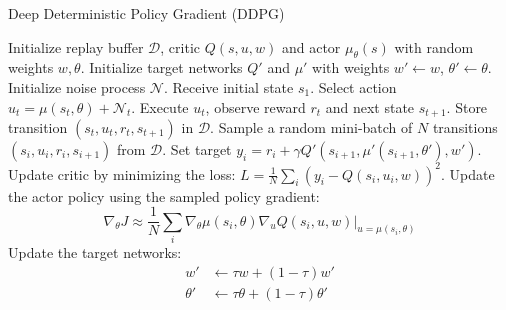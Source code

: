 \begin{frame}{Deep Deterministic Policy Gradient (DDPG)}
    \begin{algorithm}[H]
        \captionsetup{font=scriptsize}
        \caption{Deep Deterministic Policy Gradient}
        \begin{algorithmic}[1]
        \scriptsize
        \STATE Initialize replay buffer $\mathcal{D}$, critic $Q(s, u, w)$ and actor $\mu_\theta(s)$ with random weights $w, \theta$.
        \STATE Initialize target networks $Q'$ and $\mu'$ with weights $w' \leftarrow w$, $\theta' \leftarrow \theta$.
            \STATE Initialize noise process $\mathcal{N}$. Receive initial state $s_1$.
                \STATE Select action $u_t = \mu(s_t, \theta) + \mathcal{N}_t$.
                \STATE Execute $u_t$, observe reward $r_t$ and next state $s_{t+1}$.
                \STATE Store transition $(s_t, u_t, r_t, s_{t+1})$ in $\mathcal{D}$.
                \STATE Sample a random mini-batch of $N$ transitions $(s_i, u_i, r_{i}, s_{i+1})$ from $\mathcal{D}$.
                \STATE Set target $y_i = r_i + \gamma Q'(s_{i+1}, \mu'(s_{i+1}, \theta'), w')$.
                \STATE Update critic by minimizing the loss: $L = \frac{1}{N} \sum_i (y_i - Q(s_i, u_i, w))^2$.
                \STATE Update the actor policy using the sampled policy gradient:
                \[ \nabla_\theta J \approx \frac{1}{N} \sum_i \nabla_\theta \mu(s_i, \theta) \nabla_u Q(s_i, u, w)|_{u=\mu(s_i, \theta)} \]
                \STATE Update the target networks:
                \begin{align*}
                    w' &\leftarrow \tau w + (1-\tau) w' \\
                    \theta' &\leftarrow \tau \theta + (1-\tau) \theta'
                \end{align*}
            \ENDFOR
        \ENDFOR
        \end{algorithmic}
    \end{algorithm}
\end{frame}

